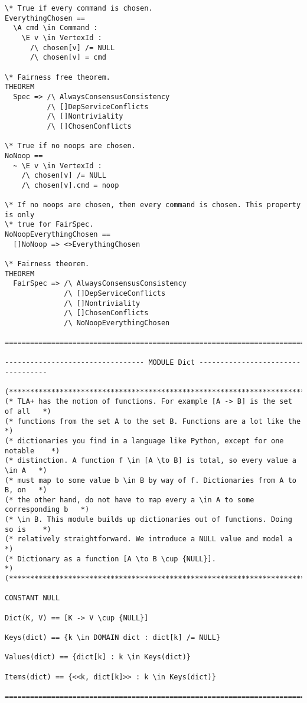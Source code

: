 \begin{verbatim}
\* True if every command is chosen.
EverythingChosen ==
  \A cmd \in Command :
    \E v \in VertexId :
      /\ chosen[v] /= NULL
      /\ chosen[v] = cmd

\* Fairness free theorem.
THEOREM
  Spec => /\ AlwaysConsensusConsistency
          /\ []DepServiceConflicts
          /\ []Nontriviality
          /\ []ChosenConflicts

\* True if no noops are chosen.
NoNoop ==
  ~ \E v \in VertexId :
    /\ chosen[v] /= NULL
    /\ chosen[v].cmd = noop

\* If no noops are chosen, then every command is chosen. This property is only
\* true for FairSpec.
NoNoopEverythingChosen ==
  []NoNoop => <>EverythingChosen

\* Fairness theorem.
THEOREM
  FairSpec => /\ AlwaysConsensusConsistency
              /\ []DepServiceConflicts
              /\ []Nontriviality
              /\ []ChosenConflicts
              /\ NoNoopEverythingChosen

================================================================================

--------------------------------- MODULE Dict ----------------------------------

(******************************************************************************)
(* TLA+ has the notion of functions. For example [A -> B] is the set of all   *)
(* functions from the set A to the set B. Functions are a lot like the        *)
(* dictionaries you find in a language like Python, except for one notable    *)
(* distinction. A function f \in [A \to B] is total, so every value a \in A   *)
(* must map to some value b \in B by way of f. Dictionaries from A to B, on   *)
(* the other hand, do not have to map every a \in A to some corresponding b   *)
(* \in B. This module builds up dictionaries out of functions. Doing so is    *)
(* relatively straightforward. We introduce a NULL value and model a          *)
(* Dictionary as a function [A \to B \cup {NULL}].                            *)
(******************************************************************************)

CONSTANT NULL

Dict(K, V) == [K -> V \cup {NULL}]

Keys(dict) == {k \in DOMAIN dict : dict[k] /= NULL}

Values(dict) == {dict[k] : k \in Keys(dict)}

Items(dict) == {<<k, dict[k]>> : k \in Keys(dict)}

================================================================================
\end{verbatim}
